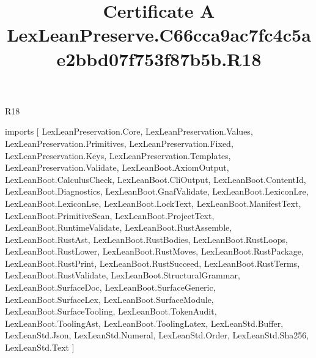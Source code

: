 \begin{lexlean}{R18}
\title{Certificate A LexLeanPreserve.C66cca9ac7fc4c5ae2bbd07f753f87b5b.R18}
\begin{coremodule}
imports [
  LexLeanPreservation.Core,
  LexLeanPreservation.Values,
  LexLeanPreservation.Primitives,
  LexLeanPreservation.Fixed,
  LexLeanPreservation.Keys,
  LexLeanPreservation.Templates,
  LexLeanPreservation.Validate,
  LexLeanBoot.AxiomOutput,
  LexLeanBoot.CalculusCheck,
  LexLeanBoot.CliOutput,
  LexLeanBoot.ContentId,
  LexLeanBoot.Diagnostics,
  LexLeanBoot.GnafValidate,
  LexLeanBoot.LexiconLre,
  LexLeanBoot.LexiconLse,
  LexLeanBoot.LockText,
  LexLeanBoot.ManifestText,
  LexLeanBoot.PrimitiveScan,
  LexLeanBoot.ProjectText,
  LexLeanBoot.RuntimeValidate,
  LexLeanBoot.RustAssemble,
  LexLeanBoot.RustAst,
  LexLeanBoot.RustBodies,
  LexLeanBoot.RustLoops,
  LexLeanBoot.RustLower,
  LexLeanBoot.RustMoves,
  LexLeanBoot.RustPackage,
  LexLeanBoot.RustPrint,
  LexLeanBoot.RustSucceed,
  LexLeanBoot.RustTerms,
  LexLeanBoot.RustValidate,
  LexLeanBoot.StructuralGrammar,
  LexLeanBoot.SurfaceDoc,
  LexLeanBoot.SurfaceGeneric,
  LexLeanBoot.SurfaceLex,
  LexLeanBoot.SurfaceModule,
  LexLeanBoot.SurfaceTooling,
  LexLeanBoot.TokenAudit,
  LexLeanBoot.ToolingAst,
  LexLeanBoot.ToolingLatex,
  LexLeanStd.Buffer,
  LexLeanStd.Json,
  LexLeanStd.Numeral,
  LexLeanStd.Order,
  LexLeanStd.Sha256,
  LexLeanStd.Text
]


\end{coremodule}
\end{lexlean}
